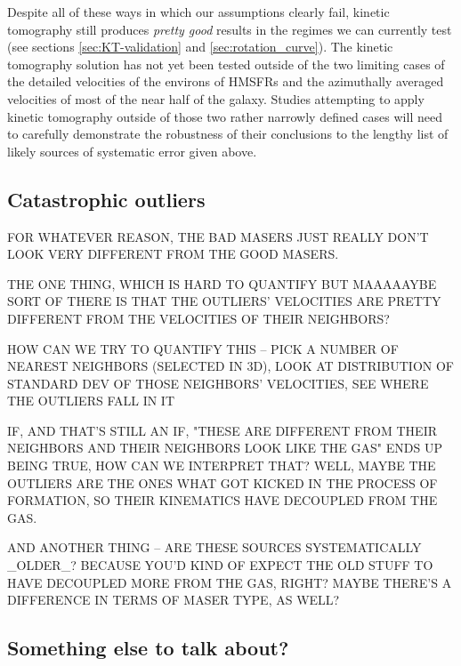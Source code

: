 Despite all of these ways in which our assumptions clearly fail, kinetic tomography still produces \emph{pretty good} results in the regimes we can currently test (see sections \ref{sec:KT-validation} and \ref{sec:rotation_curve}). 
The kinetic tomography solution has not yet been tested outside of the two limiting cases of the detailed velocities of the environs of HMSFRs and the azimuthally averaged velocities of most of the near half of the galaxy.
Studies attempting to apply kinetic tomography outside of those two rather narrowly defined cases will need to carefully demonstrate the robustness of their conclusions to the lengthy list of likely sources of systematic error given above.

\subsection{Catastrophic outliers}
\label{sec:discussion-catastrophic}
FOR WHATEVER REASON, THE BAD MASERS JUST REALLY DON'T LOOK VERY DIFFERENT FROM THE GOOD MASERS. 

THE ONE THING, WHICH IS HARD TO QUANTIFY BUT MAAAAAYBE SORT OF THERE IS THAT THE OUTLIERS' VELOCITIES ARE PRETTY DIFFERENT FROM THE VELOCITIES OF THEIR NEIGHBORS? 

HOW CAN WE TRY TO QUANTIFY THIS -- PICK A NUMBER OF NEAREST NEIGHBORS (SELECTED IN 3D), LOOK AT DISTRIBUTION OF STANDARD DEV OF THOSE NEIGHBORS' VELOCITIES, SEE WHERE THE OUTLIERS FALL IN IT

IF, AND THAT'S STILL AN IF, "THESE ARE DIFFERENT FROM THEIR NEIGHBORS AND THEIR NEIGHBORS LOOK LIKE THE GAS" ENDS UP BEING TRUE, HOW CAN WE INTERPRET THAT? WELL, MAYBE THE OUTLIERS ARE THE ONES WHAT GOT KICKED IN THE PROCESS OF FORMATION, SO THEIR KINEMATICS HAVE DECOUPLED FROM THE GAS.

AND ANOTHER THING -- ARE THESE SOURCES SYSTEMATICALLY _OLDER_? BECAUSE YOU'D KIND OF EXPECT THE OLD STUFF TO HAVE DECOUPLED MORE FROM THE GAS, RIGHT? MAYBE THERE'S A DIFFERENCE IN TERMS OF MASER TYPE, AS WELL?

\subsection{Something else to talk about?}
